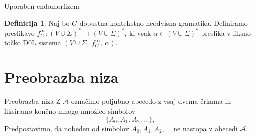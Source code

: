 \documentclass{beamer}
\newcommand{\A}{\mathcal{A}}
\theoremstyle{definition} %
\newtheorem{definicija}{Definicija}[section]
\newtheorem{izrek}[definicija]{Izrek}
\begin{document}
\begin{frame}{Uporaben endomorfizem}
    \begin{definicija}
        Naj bo $G$ dopustna kontekstno-neodvisna gramatika. Definiramo preslikavo
        $ f_G^\infty \colon (V \cup \Sigma)^* \to (V \cup \Sigma)^* $, ki vsak 
        $ \alpha \in (V \cup \Sigma)^* $ preslika v fiksno točko D0L sistema $ (V \cup \Sigma, \ f_G^\infty, \ \alpha) $.
    \end{definicija}
\end{frame}


\section{Preobrazba niza}

\begin{frame}{Preobrazba niza}
    Z $\A$ označimo poljubno abecedo z vsaj dvema črkama
    in fiksiramo končno mnogo množico simbolov
    \[
        \{A_0, A_1, A_2, \ldots \},
    \]
    Predpostavimo, da nobeden
    od simbolov $ A_0, A_1, A_2, \ldots $ ne nastopa v abecedi $\A$.
\end{frame}
\end{document}
